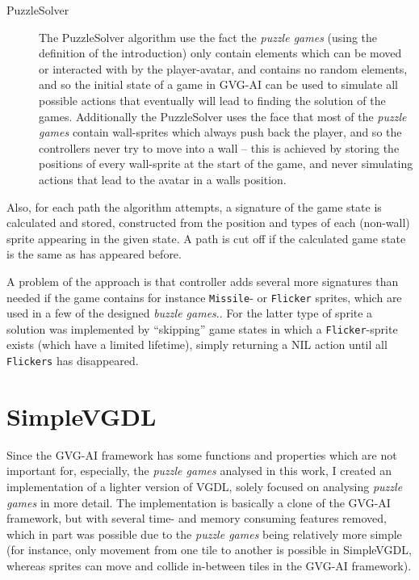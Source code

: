 \documentclass[a4paper,titlepage,final]{report}
\begin{document}
\begin{description}
\item[PuzzleSolver]
The PuzzleSolver algorithm use the fact the \textit{puzzle games} (using the definition of the introduction) only contain elements which can be moved or interacted with by the player-avatar, and contains no random elements, and so the initial state of a game in GVG-AI can be used to simulate all possible actions that eventually will lead to finding the solution of the games.
Additionally the PuzzleSolver uses the face that most of the \textit{puzzle games} contain wall-sprites which always push back the player, and so the controllers never try to move into a wall -- this is achieved by storing the positions of every wall-sprite at the start of the game, and never simulating actions that lead to the avatar in a walls position.
\end{description}

Also, for each path the algorithm attempts, a signature of the game state is calculated and stored, constructed from the position and types of each (non-wall) sprite appearing in the given state. 
A path is cut off if the calculated game state is the same as has appeared before.

A problem of the approach is that controller adds several more signatures than needed if the game contains for instance \texttt{Missile}- or \texttt{Flicker} sprites, which are used in a few of the designed \textit{buzzle games}..
For the latter type of sprite a solution was implemented by ``skipping'' game states in which a \texttt{Flicker}-sprite exists (which have a limited lifetime), simply returning a NIL action until all \texttt{Flickers} has disappeared.




\section{SimpleVGDL}
\label{sec_fastvgdl}
Since the GVG-AI framework has some functions and properties which are not important for, especially, the \textit{puzzle games} analysed in this work, I created an implementation of a lighter version of VGDL, solely focused on analysing \textit{puzzle games} in more detail.
The implementation is basically a clone of the GVG-AI framework, but with several time- and memory consuming features removed, which in part was possible due to the \textit{puzzle games} being relatively more simple (for instance, only movement from one tile to another is possible in SimpleVGDL, whereas sprites can move and collide in-between tiles in the GVG-AI framework).
\end{document}
